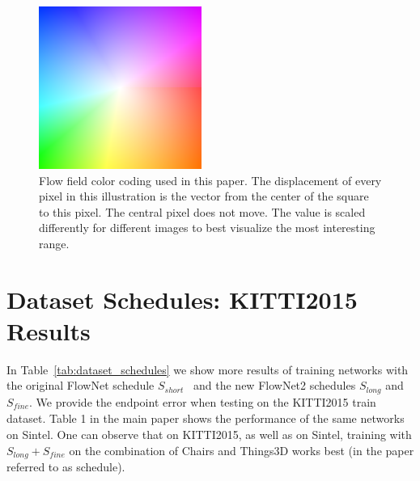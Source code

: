 \documentclass[10pt,twocolumn,letterpaper]{article}%
\newcommand{\chairs}{\mbox{Chairs}\xspace}
\newcommand{\things}{\mbox{Things3D}\xspace}
\newcommand{\Sshort}{S_\mathit{short}}
\newcommand{\Slong}{S_\mathit{long}}
\newcommand{\Sfine}{S_\mathit{fine}}
\begin{document}
\begin{figure}
\begin{center}
\includegraphics[width=0.4\linewidth]{figures/flow_key.png}
\end{center}
\caption{Flow field color coding used in this paper. The displacement of every pixel in this illustration is the vector from the center of the square to this pixel. The central pixel does not move. The value is scaled differently for different images to best visualize the most interesting range. }
\label{fig:flow_key}
\end{figure}

\section{Dataset Schedules: KITTI2015 Results} 

In Table~\ref{tab:dataset_schedules} we show more results of training networks with the original FlowNet schedule $\Sshort$~\cite{DFIB15} and the new FlowNet2 schedules $\Slong$ and $\Sfine$. We provide the endpoint error when testing on the KITTI2015 train dataset. Table 1 in the main paper shows the performance of the same networks on Sintel. One can observe that on KITTI2015, as well as on Sintel, training with $\Slong+\Sfine$ on the combination of \chairs and \things works best (in the paper referred to as \chairsToThings schedule). 
\end{document}
